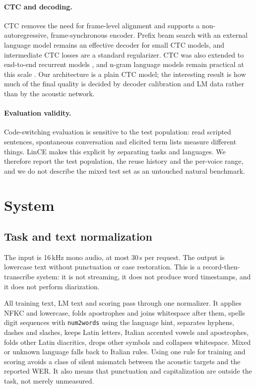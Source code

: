 \documentclass{article}
\begin{document}
\paragraph{CTC and decoding.}
CTC \citep{graves2006ctc} removes the need for frame-level alignment and supports a
non-autoregressive, frame-synchronous encoder. Prefix beam search with an external language model
\citep{graves2012sequence,hannun2014deepspeech} remains an effective decoder for small CTC
models, and intermediate CTC losses \citep{lee2021interctc} are a standard regularizer. CTC was
also extended to end-to-end recurrent models \citep{graves2014towards}, and n-gram language models
remain practical at this scale \citep{kneser1995improved,heafield2011kenlm,sundermeyer2012lstm}.
Our architecture is a plain CTC model; the interesting result is how much of the final quality is
decided by decoder calibration and LM data rather than by the acoustic network.

\paragraph{Evaluation validity.}
Code-switching evaluation is sensitive to the test population: read scripted sentences,
spontaneous conversation and elicited term lists measure different things. LinCE
\citep{aguilar2020lince} makes this explicit by separating tasks and languages. We therefore
report the test population, the reuse history and the per-voice range, and we do not describe the
mixed test set as an untouched natural benchmark.

\section{System}

\subsection{Task and text normalization}

The input is 16\,kHz mono audio, at most 30\,s per request. The output is lowercase text without
punctuation or case restoration. This is a record-then-transcribe system: it is not streaming, it
does not produce word timestamps, and it does not perform diarization.

All training text, LM text and scoring pass through one normalizer. It applies NFKC and
lowercase, folds apostrophes and joins whitespace after them, spells digit sequences with
\texttt{num2words} using the language hint, separates hyphens, dashes and slashes, keeps Latin
letters, Italian accented vowels and apostrophes, folds other Latin diacritics, drops other
symbols and collapses whitespace. Mixed or unknown language falls back to Italian rules. Using
one rule for training and scoring avoids a class of silent mismatch between the acoustic targets
and the reported WER. It also means that punctuation and capitalization are outside the task,
not merely unmeasured.
\end{document}
